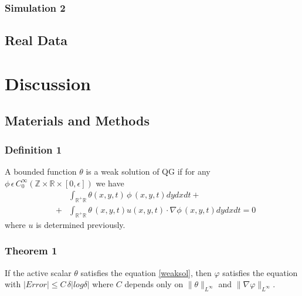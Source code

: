 \documentclass[a4paper, oneside, twocolumn, 11pt, green]{ssjtwo}
\begin{document}
\begin{article}
\subsubsection{Simulation 2}

\lipsum[1]

\subsection*{Real Data}

\lipsum[1]

\section*{Discussion}

\lipsum[1]

\lipsum[1]

\lipsum[1]

\subsection*{Materials and Methods}

\lipsum[1]

\subsubsection*{Definition 1}A bounded function $\theta$ is a weak solution of QG if for any
$\phi\,\epsilon\, C_0^{\infty}
(\mathbb{Z}\times\mathbb{R}
\times[0,\epsilon ])$ we have
\begin{eqnarray}
&&  \int_{\mathbb{R}^+\mathbb{R}}
 \theta(x,y,t)\, \phi
\,(x,y,t) dy dx dt+\nonumber\\
  & +&\int_{\mathbb{R}^+\mathbb{R}}
 \theta\,(x,y,t) u(x,y,t)\cdot\nabla\phi\,(x,y,t)
dydxdt = 0 \label{weaksol} \end{eqnarray}
where $u$ is determined previously.

\lipsum[1]

\subsubsection*{Theorem 1}
If the active scalar $\theta$ satisfies
the equation \eqref{weaksol}, then $\varphi$ satisfies the equation
with $|Error|\leq C\, \delta | log\delta| $ where $C$ depends only
on $\|\theta\|_{L^{\infty}}$ and $\|
\nabla\varphi\|_{L^{\infty}}$.

\lipsum[1]
\begin{acknowledgments}
\lipsum[1]
\end{acknowledgments}

\end{article}
\end{document}
